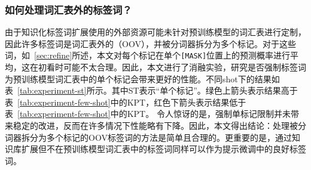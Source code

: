 \begin{table}[!htbp]
\caption{限制扩展标签词为预训练模型词汇表中的单个标记的结果}
\begin{center}
\end{center}
\label{tab:experiment-st}
\end{table}

\subsubsection{如何处理词汇表外的标签词？}
\label{app:experiment-st}
由于知识化标签词扩展使用的外部资源可能未针对预训练模型的词汇表进行定制，因此许多标签词是词汇表外的（OOV），并被分词器拆分为多个标记。对于这些词，如~\ref{sec:refine}所述，本文对每个标记在单个\texttt{[MASK]}位置上的预测概率进行平均，这在初看时可能不太合理。因此，本文进行了消融实验，研究是否强制标签词为预训练模型词汇表中的单个标记会带来更好的性能。不同shot下的结果如表~\ref{tab:experiment-st}所示。其中ST表示“单个标记”。绿色上箭头\gd 表示结果高于表~\ref{tab:experiment-few-shot}中的KPT，红色下箭头\bd 表示结果低于表~\ref{tab:experiment-few-shot}中的KPT。 令人惊讶的是，强制单标记限制并未带来稳定的改进，反而在许多情况下性能略有下降。因此，本文得出结论：处理被分词器拆分为多个标记的OOV标签词的方法是简单且合理的。更重要的是，通过知识库扩展但不在预训练模型词汇表中的标签词同样可以作为提示微调中的良好标签词。

